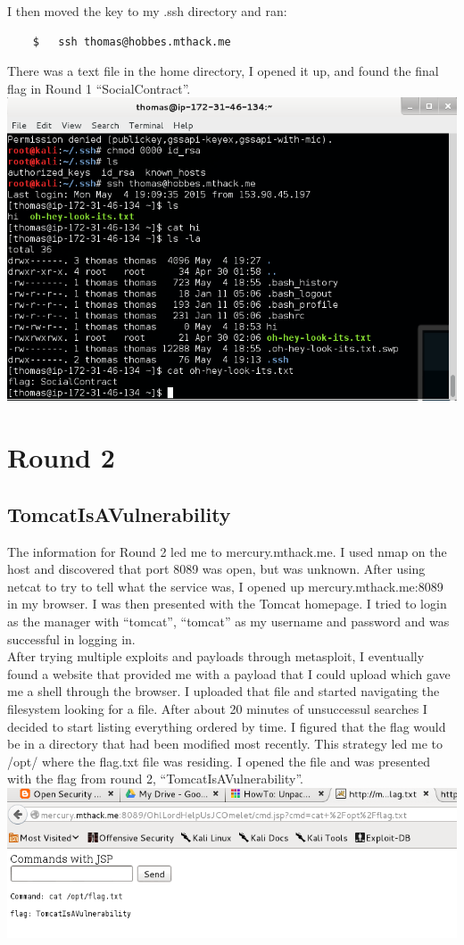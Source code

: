 \documentclass[12pt]{report}
\newcommand{\mychapter}[2]{
    \setcounter{chapter}{#1}
    \setcounter{section}{0}
    \chapter*{#2}
    \addcontentsline{toc}{chapter}{#2}
}
\begin{document}
I then moved the key to my .ssh directory and ran:
	\begin{verbatim}
	$	ssh thomas@hobbes.mthack.me
	\end{verbatim}

There was a text file in the home directory, I opened it up, and found the final flag in Round 1 ``SocialContract''.\\
\includegraphics[scale=0.33, width=\linewidth]{SocialContract.png}
\clearpage


\mychapter{3}{Round 2}
\section{TomcatIsAVulnerability}
The information for Round 2 led me to mercury.mthack.me. I used nmap on the host and discovered that port 8089 was open, but was unknown. After using netcat to try to tell what the service was, I opened up mercury.mthack.me:8089 in my browser. I was then presented with the Tomcat homepage. I tried to login as the manager with ``tomcat'', ``tomcat'' as my username and password and was successful in logging in.\\
After trying multiple exploits and payloads through metasploit, I eventually found a website that provided me with a payload that I could upload which gave me a shell through the browser. I uploaded that file and started navigating the filesystem looking for a file. After about 20 minutes of unsuccessul searches I decided to start listing everything ordered by time. I figured that the flag would be in a directory that had been modified most recently. This strategy led me to /opt/ where the flag.txt file was residing. I opened the file and was presented with the flag from round 2, ``TomcatIsAVulnerability''.\\
\includegraphics[scale=0.33, width=\linewidth]{TomcatIsAVulnerability.png}
\newline
\end{document}
